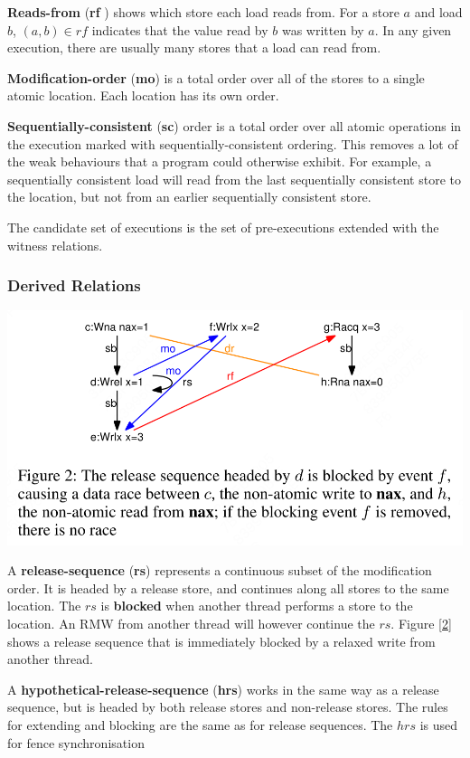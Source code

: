 \documentclass[11pt]{article}
\begin{document}
\textbf{Reads-from} (\textbf{rf} ) shows which store each load reads from. For a store \(a\) and load \(b\),
\((a,b)\in rf\) indicates that the value read by \(b\) was written by \(a\). In any given execution,
there are usually many stores that a load can read from.

\textbf{Modification-order} (\textbf{mo}) is a total order over all of the stores to a single atomic location. Each location has its own order.

\textbf{Sequentially-consistent} (\textbf{sc}) order is a total order over all atomic operations in the execution marked
with sequentially-consistent ordering. This removes a lot of the weak behaviours that a program could
otherwise exhibit. For example, a sequentially consistent load will read from the last sequentially
consistent store to the location, but not from an earlier sequentially consistent store.

The candidate set of executions is the set of pre-executions extended with the witness relations.
\subsubsection{Derived Relations}
\label{sec:orgb571b01}
\begin{center}
\includegraphics[width=.7\textwidth]{../../images/papers/127.png}
\label{2}
\end{center}

A \textbf{release-sequence} (\textbf{rs}) represents a continuous subset of the modification order. It is headed by a
release store, and continues along all stores to the same location. The \(rs\) is \textbf{blocked} when another
thread performs a store to the location. An RMW from another thread will however continue the \(rs\).
Figure \ref{2} shows a release sequence that is immediately blocked by a relaxed write from another
thread.

A \textbf{hypothetical-release-sequence} (\textbf{hrs}) works in the same way as a release sequence, but is headed by
both release stores and non-release stores. The rules for extending and blocking are the same as for
release sequences. The \(hrs\) is used for fence synchronisation
\end{document}
